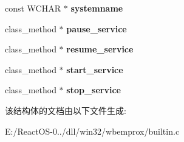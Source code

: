 \begin{DoxyCompactItemize}
const W\+C\+H\+AR $\ast$ {\bfseries systemname}
\item 
\mbox{\label{structrecord__service_a6299aa9f27f8c0276c4dd0bf45432ebe}} 
class\+\_\+method $\ast$ {\bfseries pause\+\_\+service}
\item 
\mbox{\label{structrecord__service_a8057e185e908c105b6eaefec009bbab2}} 
class\+\_\+method $\ast$ {\bfseries resume\+\_\+service}
\item 
\mbox{\label{structrecord__service_ae9f180e5f9c3cea066aeca55bc836163}} 
class\+\_\+method $\ast$ {\bfseries start\+\_\+service}
\item 
\mbox{\label{structrecord__service_a0fd26bdd40af013b6ab956eb8a17e25b}} 
class\+\_\+method $\ast$ {\bfseries stop\+\_\+service}
\end{DoxyCompactItemize}


该结构体的文档由以下文件生成\+:\begin{DoxyCompactItemize}
\item 
E\+:/\+React\+O\+S-\/0../dll/win32/wbemprox/builtin.\+c\end{DoxyCompactItemize}
